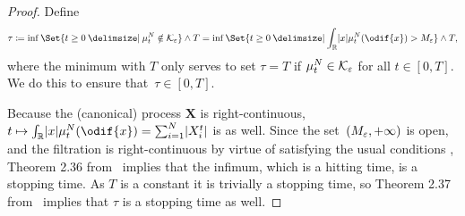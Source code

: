 \begin{proof}
  Define
  \begin{equation}
    \tau \coloneqq  \inf\Set{ t \geq 0 \given \mu_t^N \notin \cK_\eps } \land T
    = \inf\Set{ t \geq 0 \given \int_\potspace \abs{x} \mu_t^N(\odif{x}) > M_\eps } \land T,
  \end{equation}
  where the minimum with \( T \) only serves to set \( \tau = T \) if \( \mu_t^N \in \mathcal{K}_\varepsilon \) for all \( t \in [0, T] \).
  We do this to ensure that~\( \tau \in [0,T] \).

  Because the (canonical) process \( \bm{X} \) is right-continuous, \( t \mapsto \int_\potspace \abs{x} \mu_t^N(\odif{x}) = \sum_{i=1}^N \abs{X_i^t} \) is as well.
  Since the set~\( (M_\varepsilon, +\infty) \) is open, and the filtration is right-continuous by virtue of satisfying the usual conditions , Theorem 2.36 from~\cite{klebanerIntroductionStochasticCalculus2012} implies that the infimum, which is a hitting time, is a stopping time.
  As \( T \) is a constant it is trivially a stopping time, so Theorem 2.37 from~\cite{klebanerIntroductionStochasticCalculus2012} implies that \( \tau \) is a stopping time as well.



\end{proof}
